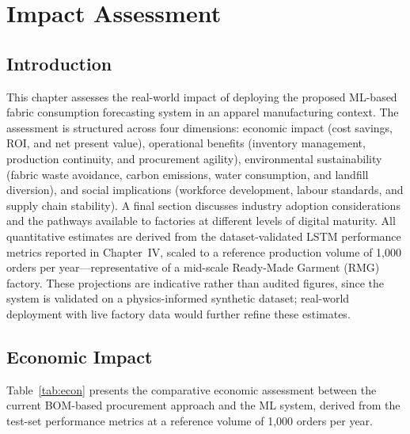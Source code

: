 \chapter{Impact Assessment}
\label{ch:impact}
\sloppy
{}

\section{Introduction}
This chapter assesses the real-world impact of deploying the proposed ML-based fabric consumption forecasting system in an apparel manufacturing context. The assessment is structured across four dimensions: economic impact (cost savings, ROI, and net present value), operational benefits (inventory management, production continuity, and procurement agility), environmental sustainability (fabric waste avoidance, carbon emissions, water consumption, and landfill diversion), and social implications (workforce development, labour standards, and supply chain stability). A final section discusses industry adoption considerations and the pathways available to factories at different levels of digital maturity. All quantitative estimates are derived from the dataset-validated LSTM performance metrics reported in Chapter~IV, scaled to a reference production volume of 1{,}000 orders per year---representative of a mid-scale Ready-Made Garment (RMG) factory. These projections are indicative rather than audited figures, since the system is validated on a physics-informed synthetic dataset; real-world deployment with live factory data would further refine these estimates.

\secdiv
\section{Economic Impact}
\label{sec:econ}

Table~\ref{tab:econ} presents the comparative economic assessment between the current BOM-based procurement approach and the ML system, derived from the test-set performance metrics at a reference volume of 1{,}000 orders per year.

